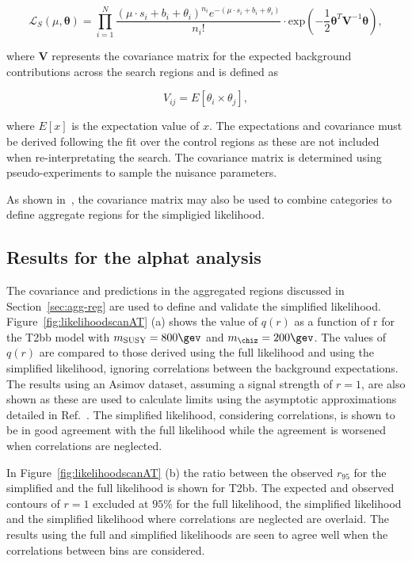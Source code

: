 \begin{equation}
\mathcal{L}_{S}(\mu, \boldsymbol{\theta}) =  \prod_{i=1}^{N} \dfrac{(\mu \cdot s_{i}+b_{i}+\theta_{i})^{n_{i}} e^{-(\mu \cdot s_{i}+b_{i}+\theta_{i})} }{n_{i}!} \cdot  
\mathrm{exp}\left(-\dfrac{1}{2} \boldsymbol{\theta}^{T}\mathrm{\mathbf{V}}^{-1}\boldsymbol{\theta} \right),
\label{eq:full-likelihood}
\end{equation}

where $\mathrm{\mathbf{V}}$ represents the covariance matrix for the expected background 
contributions across the search regions and is defined as

\begin{equation}
V_{ij}=E[\theta_i\times\theta_j],
\label{eq-cov}
\end{equation}

where $E[x]$ is the expectation value of $x$. The expectations and covariance
must be derived following the fit over the control regions as these are not
included when re-interpretating the search. The covariance matrix is determined
using pseudo-experiments to sample the nuisance parameters. 

As shown in~\cite{simp-lik}, the covariance matrix may also be used to
combine categories to define aggregate regions for the simpligied likelihood.

\subsection{Results for the alphat analysis}

The covariance and predictions in the aggregated regions discussed
in Section~\ref{sec:agg-reg} are used to define and validate the simplified likelihood. 
Figure~\ref{fig:likelihoodscanAT} (a) shows the value of $q(r)$ as a function of r for 
the T2bb model with $m_\text{SUSY} = 800 \gev$ and $m_{\chiz} = 200 \gev$. 
The values of $q(r)$ are compared to those derived using the full likelihood and 
using the simplified likelihood, ignoring correlations between the background expectations. 
The results using an Asimov dataset, assuming a signal strength of $r=1$, are also 
shown as these are used to calculate limits using the asymptotic approximations 
detailed in Ref.~\cite{Cowan:2010js}. The simplified likelihood,
considering correlations, is shown to be in good agreement with the full likelihood while
the agreement is worsened when correlations are neglected.

In Figure~\ref{fig:likelihoodscanAT} (b) the ratio between the observed $r_{95}$ for the simplified 
and the full likelihood is shown for T2bb. The expected and observed contours of $r=1$ 
excluded at $95\%$ for the full likelihood, the simplified likelihood and the 
simplified likelihood where correlations are neglected are overlaid. The results using the 
full and simplified likelihoods are seen to agree well when the correlations between bins are considered.

